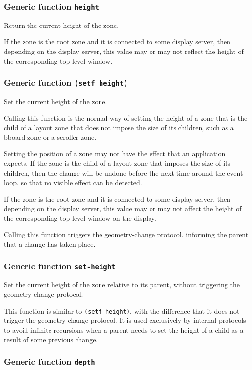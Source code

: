 \documentclass{report}
\begin{document}
\subsubsection{Generic function \texttt{height}}

Return the current height of the zone.

If the zone is the root zone and it is connected to some display
server, then depending on the display server, this value may or
may not reflect the height of the corresponding top-level window.

\subsubsection{Generic function \texttt{(setf height)}}

Set the current height of the zone.

Calling this function is the normal way of setting the height of a
zone that is the child of a layout zone that does not impose the
size of its children, such as a bboard zone or a scroller zone.

Setting the position of a zone may not have the effect that an
application expects.  If the zone is the child of a layout zone
that imposes the size of its children, then the change will be
undone before the next time around the event loop, so that no
visible effect can be detected.

If the zone is the root zone and it is connected to some display
server, then depending on the display server, this value may or
may not affect the height of the corresponding top-level window on
the display.

Calling this function triggers the geometry-change protocol,
informing the parent that a change has taken place.

\subsubsection{Generic function \texttt{set-height}}

Set the current height of the zone relative to its parent, without
triggering the geometry-change protocol.

This function is similar to \texttt{(setf height)}, with the
difference that it does not trigger the geometry-change protocol.  It
is used exclusively by internal protocols to avoid infinite recursions
when a parent needs to set the height of a child as a result of some
previous change.

\subsubsection{Generic function \texttt{depth}}
\end{document}

